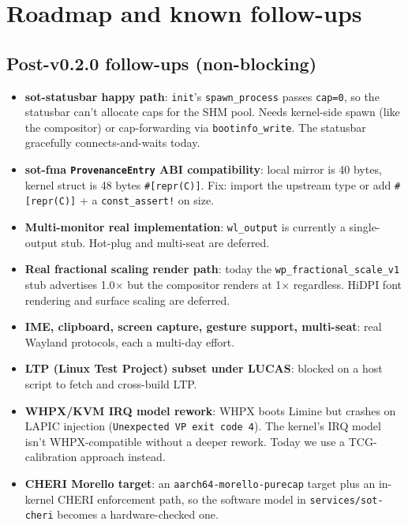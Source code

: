 \documentclass[11pt,a4paper]{article}
\begin{document}
\section{Roadmap and known follow-ups}

\subsection{Post-v0.2.0 follow-ups (non-blocking)}

\begin{itemize}[leftmargin=1.4em,itemsep=0.3em]
  \item \textbf{sot-statusbar happy path}: \texttt{init}'s
        \texttt{spawn\_process} passes \texttt{cap=0}, so the
        statusbar can't allocate caps for the SHM pool. Needs
        kernel-side spawn (like the compositor) or cap-forwarding
        via \texttt{bootinfo\_write}. The statusbar gracefully
        connects-and-waits today.

  \item \textbf{sot-fma \texttt{ProvenanceEntry} ABI compatibility}:
        local mirror is 40 bytes, kernel struct is 48 bytes
        \texttt{\#[repr(C)]}. Fix: import the upstream type or add
        \texttt{\#[repr(C)]} + a \texttt{const\_assert!} on size.

  \item \textbf{Multi-monitor real implementation}: \texttt{wl\_output}
        is currently a single-output stub. Hot-plug and multi-seat
        are deferred.

  \item \textbf{Real fractional scaling render path}: today the
        \texttt{wp\_fractional\_scale\_v1} stub advertises 1.0$\times$
        but the compositor renders at 1$\times$ regardless. HiDPI
        font rendering and surface scaling are deferred.

  \item \textbf{IME, clipboard, screen capture, gesture support,
        multi-seat}: real Wayland protocols, each a multi-day effort.

  \item \textbf{LTP (Linux Test Project) subset under LUCAS}:
        blocked on a host script to fetch and cross-build LTP.

  \item \textbf{WHPX/KVM IRQ model rework}: WHPX boots Limine but
        crashes on LAPIC injection
        (\texttt{Unexpected VP exit code 4}). The kernel's IRQ model
        isn't WHPX-compatible without a deeper rework. Today we use
        a TCG-calibration approach instead.

  \item \textbf{CHERI Morello target}: an
        \texttt{aarch64-morello-purecap} target plus an in-kernel
        CHERI enforcement path, so the software model in
        \texttt{services/sot-cheri} becomes a hardware-checked one.
\end{itemize}
\end{document}
